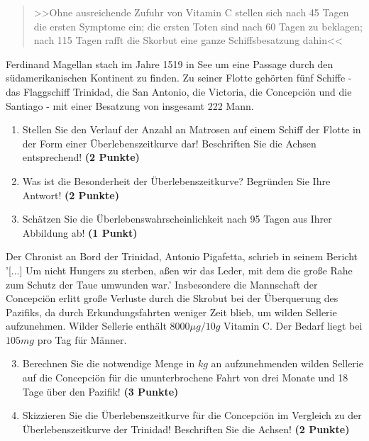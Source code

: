 \documentclass[a4paper, 9pt]{scrartcl}\usepackage[]{graphicx}\usepackage[]{xcolor}
\begin{document}
\begin{quote}
  >>Ohne ausreichende Zufuhr von Vitamin C stellen sich nach 45 Tagen die ersten Symptome ein; die ersten Toten sind nach 60 Tagen zu beklagen; nach 115 Tagen rafft die Skorbut eine ganze Schiffsbesatzung dahin<<
\end{quote}

Ferdinand Magellan stach im Jahre 1519 in See um eine Passage durch den südamerikanischen Kontinent zu finden. Zu seiner Flotte gehörten fünf Schiffe - das Flaggschiff Trinidad, die San Antonio, die Victoria, die Concepciön und die Santiago - mit einer Besatzung von insgesamt 222 Mann. 

\begin{enumerate}
\item Stellen Sie den Verlauf der Anzahl an Matrosen auf einem Schiff der Flotte in der Form einer Überlebenszeitkurve dar! Beschriften Sie die Achsen entsprechend! \textbf{(2 Punkte)} 
\item Was ist die Besonderheit der Überlebenszeitkurve? Begründen Sie Ihre Antwort! \textbf{(2 Punkte)} 
\item Schätzen Sie die Überlebenswahrscheinlichkeit nach 95 Tagen aus Ihrer Abbildung ab! \textbf{(1 Punkt)} 
\end{enumerate}

Der Chronist an Bord der Trinidad, Antonio Pigafetta, schrieb in seinem Bericht '[...] Um nicht Hungers zu sterben, aßen wir das Leder, mit dem die große Rahe zum Schutz der Taue umwunden war.' Insbesondere die Mannschaft der Concepciön erlitt große Verluste durch die Skrobut bei der Überquerung des Pazifiks, da durch Erkundungsfahrten weniger Zeit blieb, um wilden Sellerie aufzunehmen. Wilder Sellerie enthält $8000\mu g/10g$ Vitamin C. Der Bedarf liegt bei $105mg$ pro Tag für Männer.

\begin{enumerate}
  \setcounter{enumi}{2}
\item Berechnen Sie die notwendige Menge in $kg$ an aufzunehmenden wilden Sellerie auf die Concepciön für die ununterbrochene Fahrt von drei Monate und 18 Tage über den Pazifik! \textbf{(3 Punkte)}
\item Skizzieren Sie die Überlebenszeitkurve für die Concepciön im Vergleich zu der Überlebenszeitkurve der Trinidad! Beschriften Sie die Achsen! \textbf{(2 Punkte)}
\end{enumerate}

 
\clearpage
\end{document}
